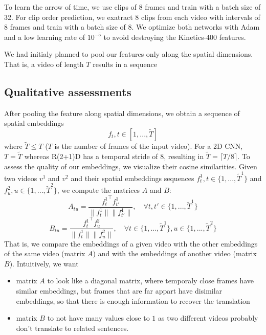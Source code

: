 \documentclass[final]{cvpr}
\begin{document}
To learn the arrow of time, we use clips of 8 frames and train with a batch size of 32. For clip order prediction, we exatract 8 clips from each video with intervals of 8 frames and train with a batch size of 8. We optimize both networks with Adam and a low learning rate of $10^{-5}$ to avoid destroying the Kinetics-400 features.

We had initialy planned to pool our features only along the spatial dimensions. That is, a video of length $T$ results in a sequence

\subsection{Qualitative assessments}
After pooling the feature along spatial dimensions, we obtain a sequence of spatial embeddings
$$f_t, t\in[1, ..., \tilde{T}]$$
where $\tilde{T}\leq T$ ($T$ is the number of frames of the input video). For a 2D CNN, $T=\tilde{T}$ whereas R(2+1)D has a temporal stride of $8$, resulting in $\tilde{T} = \lceil T/8 \rceil$.
To assess the quality of our embeddings, we visualize their cosine similarities. Given two videos $v^1$ and $v^2$ and their spatial embeddings sequences $f_t^1, t\in\{1, ..., \tilde{T}^1\}$ and $f_u^2, u\in \{1, ...,  \tilde{T}^2\}$, we compute the matrices $A$ and $B$:
$$A_{tu} = \frac{{f_t^1}^\intercal f_{t'}^1}{\lVert f_t^1 \rVert \lVert f_{t'}^1 \rVert}, \quad\forall t, t' \in\{1, ..., \tilde{T}^1\}$$
$$B_{tu} = \frac{{f_t^1}^\intercal f_u^2}{\lVert f_t^1 \rVert \lVert f_u^2 \rVert}, \quad \forall t \in\{1, ..., \tilde{T}^1\}, u \in\{1, ..., \tilde{T}^2\}$$
That is, we compare the embeddings of a given video with the other embeddings of the same video (matrix $A$) and with the embeddings of another video (matrix $B$). Intuitively, we want 
\begin{itemize}
	\item matrix $A$ to look like a diagonal matrix, where temporaly close frames have similar embeddings, but frames that are far appart have disimilar embeddings, so that there is enough information to recover the translation
	\item matrix $B$ to not have many values close to $1$ as two different videos probably don't translate to related sentences.
\end{itemize}


{\small


}
\end{document}
